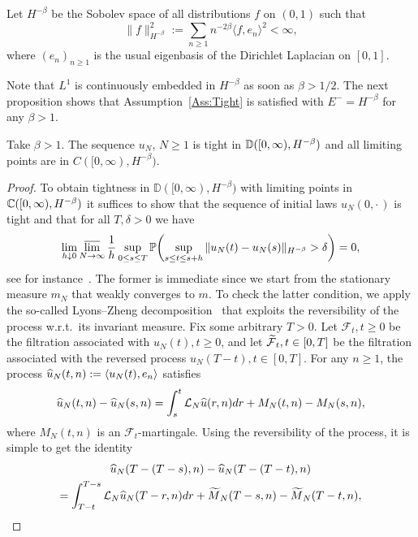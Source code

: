 \documentclass[AHL,Unicode,longabstracts]{cedram}
\theoremstyle{plain}
\newcommand{\bbC}{\mathbb{C}}
\newcommand{\bbD}{\mathbb{D}}
\newcommand{\bbP}{\mathbb{P}}
\newcommand{\cF}{\mathcal{F}}
\newcommand{\cL}{\mathcal{L}}
\let\oldtilde\tilde
\renewcommand*{\tilde}[1]{\mathchoice{\widetilde{#1}}{\widetilde{#1}}{\oldtilde{#1}}{\oldtilde{#1}}}
\let\oldhat\hat
\renewcommand*{\hat}[1]{\mathchoice{\widehat{#1}}{\widehat{#1}}{\oldhat{#1}}{\oldhat{#1}}}
\let\originalleft\left
\let\originalright\right
\renewcommand{\left}{\mathopen{}\mathclose\bgroup\originalleft}
\renewcommand{\right}{\aftergroup\egroup\originalright}
\renewcommand*{\to}{\mathchoice{\longrightarrow}{\rightarrow}{\rightarrow}{\rightarrow}}
\begin{document}
Let $H^{-\beta}$ be the Sobolev space of all distributions $f$ on $(0,1)$ such that
\[
\|f\|_{H^{-\beta}}^2 := \sum_{n\ge 1} n^{-2\beta} \langle f,e_n\rangle^2 < \infty,
\]
where $(e_n)_{n\ge 1}$ is the usual eigenbasis of the Dirichlet Laplacian on $[0,1]$.

Note that $L^1$ is continuously embedded in $H^{-\beta}$ as soon as $\beta > 1/2$. The next proposition shows that Assumption~\ref{Ass:Tight} is satisfied with $E^-=H^{-\beta}$ for any $\beta > 1$.

\begin{prop}\label{Prop:TightZRP}
Take $\beta > 1$. The sequence $u_N$, $N\ge 1$ is tight in $\bbD([0,\infty),\linebreak H^{-\beta})$ and all limiting points are in $C([0,\infty),H^{-\beta})$.
\end{prop}
\begin{proof}
To obtain tightness in $\bbD([0,\infty), H^{-\beta})$ with limiting points in $\bbC([0,\infty),\linebreak H^{-\beta})$ it suffices to show that the sequence of initial laws $u_N(0,\cdot\,)$ is tight and that for all $T,\delta > 0$ we have
\begin{equation}\label{Eq:TightnessZRP}
\lim_{h\downarrow 0} \varlimsup_{N\to\infty} \frac{1}{h} \sup_{0 \leq s \leq T} \bbP\left(\sup_{s\leq t \leq s+h} \| u_N(t) - u_N(s) \|_{H^{-\beta}} > \delta \right) = 0,
\end{equation}
see for instance~\cite[Theorem~13.2]{Billingsley}. The former is immediate since we start from the stationary measure $m_N$ that weakly converges to $m$. To check the latter condition, we apply the so-called Lyons--Zheng decomposition~\cite{LyonsZheng} that exploits the reversibility of the process w.r.t.~its invariant measure. Fix some arbitrary $T>0$. Let $\cF_t,t\geq 0$ be the filtration associated with $u_N(t),t\geq 0$, and let $\tilde{\cF}_t,t\in[0,T]$ be the filtration associated with the reversed process $u_N(T-t),t\in[0,T]$. For any $n\ge 1$, the process $\hat{u}_N(t,n):=\langle u_N(t), e_n\rangle$ satisfies
\begin{equation}
\hat{u}_N(t,n)-\hat{u}_N(s,n) = \int_s^t \cL_N \hat{u}(r,n) dr + M_N(t,n) - M_N(s,n),
\end{equation}
where $M_N(t,n)$ is an $\cF_t$-martingale. Using the reversibility of the process, it is simple to get the identity
\begin{multline}
\hat{u}_N(T-(T-s),n)-\hat{u}_N(T-(T-t),n)\\
= \int_{T-t}^{T-s} \cL_N \hat{u}_N(T-r,n) dr + \tilde{M}_N(T-s,n) - \tilde{M}_N(T-t,n),

\end{multline}
\end{proof}
\end{document}
